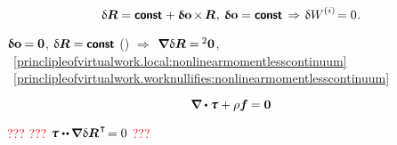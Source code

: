 

\nopagebreak\vspace{-0.2em}\begin{equation}\label{princlipleofvirtualwork.worknullifies:nonlinearmomentlesscontinuum}
\variation{\bm{R}} = \boldconst \hspace{.1ex} + \varvector{o} \hspace{-0.2ex} \times \hspace{-0.2ex} \bm{R} \hspace{.1ex}, \:
\varvector{o} = \boldconst
\hspace{.4ex}\Rightarrow\hspace{.2ex}
\variation{\internalwork} \hspace{-0.2ex} = 0 \hspace{.1ex}.
\end{equation}

\vspace{-0.1em}  ${\bm{\updelta}\hspace{-0.125ex}\bm{\mathrm{\bm{o}}} \hspace{-0.1ex} = \bm{0}}$, ${\variation{\bm{R}} = \boldconst}$ () ${\Rightarrow}$~${\hspace{-0.2ex}\boldnabla \hspace{.1ex} \variation{\bm{R}} = \hspace{-0.12ex} {^2\bm{0}}}$,
~\eqref{princlipleofvirtualwork.local:nonlinearmomentlesscontinuum}
~\eqref{princlipleofvirtualwork.worknullifies:nonlinearmomentlesscontinuum}

\nopagebreak\vspace{-0.2em}\begin{equation*}
\boldnabla \dotp \cauchystress + \rho \bm{f} \hspace{-0.1ex} = \bm{0}
\end{equation*}

\vspace{-0.5em} \noindent \textcolor{red}{???}  \textcolor{red}{???} ${\cauchystress \dotdotp \hspace{-0.12ex} \boldnabla \hspace{.1ex} \variation{\bm{R}}^{\hspace{.16ex}\T} \hspace{-0.32ex} = 0}$ \textcolor{red}{???}

